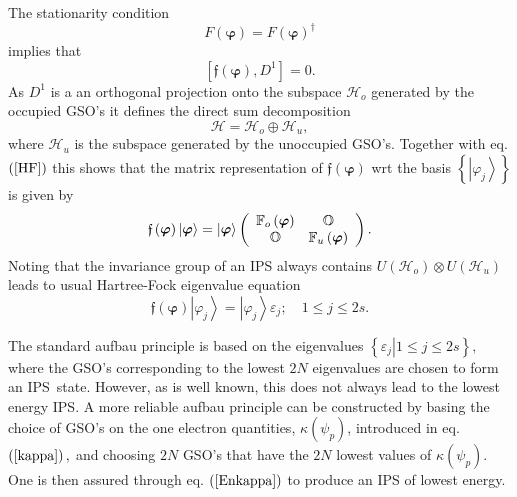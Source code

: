 \documentclass[aps,preprint]{revtex4}%
\begin{document}
The stationarity condition
\begin{equation}
F\left(  \bm{\varphi}\right)  =F\left(  \bm{\varphi}\right)  ^{\dagger}%
\end{equation}
implies that
\begin{equation}
\left[  \mathfrak{f}\left(  \bm{\varphi}\right)  ,D^{1}\right]  =0. \label{HF}%
\end{equation}
As $D^{1}$ is a an orthogonal projection onto the subspace $\mathcal{H}_{o}$
generated by the occupied GSO's it defines the direct sum decomposition
\begin{equation}
\mathcal{H=H}_{o}\oplus\mathcal{H}_{u}, \label{DS}%
\end{equation}
where $\mathcal{H}_{u}$ is the subspace generated by the unoccupied GSO's.
Together with eq. $\left(  \ref{HF}\right)  $ this shows that the matrix
representation of $\mathfrak{f}\left(  \bm{\varphi}\right)  $ wrt the basis
$\left\{  \left\vert \varphi_{j}\right\rangle \right\}  $ is given by
\begin{equation}
\mathfrak{f}\left(  \bm{\varphi}\right)  \left\vert \bm{\varphi }\right\rangle
=\left\vert \bm{\varphi}\right\rangle \left(
\begin{array}
[c]{cc}%
\mathbb{F}_{o}\left(  \bm{\varphi}\right)  & \mathbb{O}\\
\mathbb{O} & \mathbb{F}_{u}\left(  \bm{\varphi}\right)
\end{array}
\right)  .
\end{equation}
Noting that the invariance group of an IPS always contains $U\left(
\mathcal{H}_{o}\right)  \otimes U\left(  \mathcal{H}_{u}\right)  $ leads to
usual Hartree-Fock eigenvalue equation
\begin{equation}
\mathfrak{f}\left(  \bm{\varphi}\right)  \left\vert \varphi_{j}\right\rangle
=\left\vert \varphi_{j}\right\rangle \varepsilon_{j};\quad1\leq j\leq2s.
\end{equation}


The standard aufbau principle is based on the eigenvalues $\left\{  \left.
\varepsilon_{j}\right\vert 1\leq j\leq2s\right\}  ,$ where the GSO's
corresponding to the lowest $2N$ eigenvalues are chosen to form an IPS\ state.
However, as is well known, this does not always lead to the lowest energy IPS.
A more reliable aufbau principle can be constructed by basing the choice of
GSO's on the one electron quantities, $\kappa\left(  \psi_{p}\right)  $,
introduced in eq. $\left(  \ref{kappa}\right)  ,$ and choosing $2N$ GSO's that
have the $2N$ lowest values of $\kappa\left(  \psi_{p}\right)  $. One is then
assured through eq. $\left(  \ref{Enkappa}\right)  $ to produce an IPS of
lowest energy.
\end{document}
